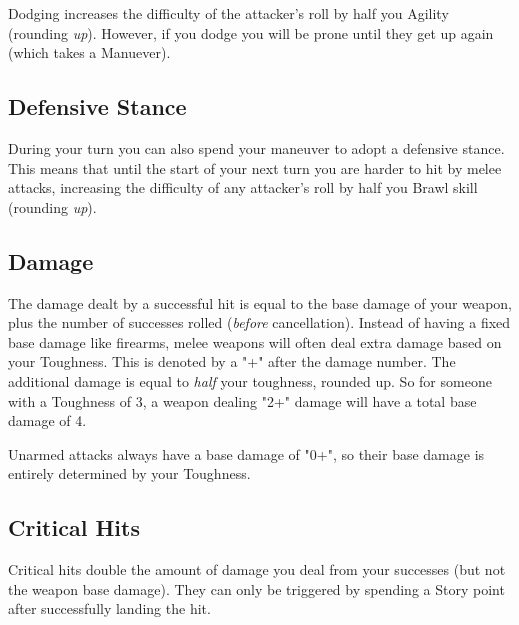 Dodging increases the difficulty of the attacker's roll by half you Agility (rounding \textit{up}).
However, if you dodge you will be prone until they get up again (which takes a Manuever).


\subsection{Defensive Stance}
During your turn you can also spend your maneuver to adopt a defensive stance.
This means that until the start of your next turn you are harder to hit by melee attacks,
increasing the difficulty of any attacker's roll by half you Brawl skill (rounding \textit{up}).

 
\subsection{Damage} \label{damage}
The damage dealt by a successful hit is equal to the base damage of your weapon, 
plus the number of successes rolled (\textit{before} cancellation). 
Instead of having a fixed base damage like firearms, melee weapons will often deal extra damage based on your Toughness.
This is denoted by a "+" after the damage number.
The additional damage is equal to \textit{half} your toughness, rounded up.
So for someone with a Toughness of 3, a weapon dealing "2+" damage will have a total base damage of 4.

Unarmed attacks always have a base damage of "0+", 
so their base damage is entirely determined by your Toughness.



\subsection{Critical Hits} \label{critical hit}
Critical hits double the amount of damage you deal from your successes 
(but not the weapon base damage).
They can only be triggered by spending a Story point after successfully landing the hit. 


